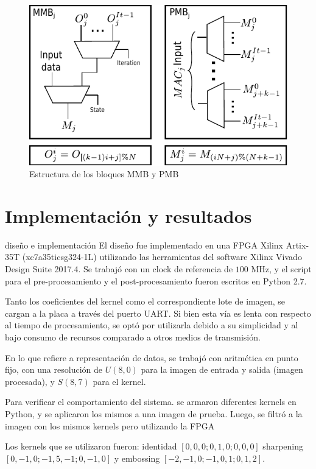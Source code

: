 \documentclass[]{IEEEphot}
\begin{document}
\bigskip
\bigskip
\begin{figure}[H]
\centering
\includegraphics{muxes_cont}
\caption{ Estructura de los bloques MMB y PMB}
\label{mmu_structure}
\end{figure}


\section{Implementación y resultados}  \label{implementations_sec}
 diseño e implementación
El diseño fue implementado en una FPGA Xilinx Artix-35T (xc7a35ticsg324-1L) utilizando las herramientas del software
Xilinx Vivado Design Suite 2017.4. Se trabajó con un clock de referencia de $100$ MHz, y el script para el pre-procesamiento 
y el post-procesamiento fueron escritos en Python 2.7.

Tanto los coeficientes del kernel como el correspondiente lote de imagen, se cargan a la placa a través
del puerto UART. Si bien esta vía es lenta con respecto al tiempo de procesamiento, se optó por utilizarla
debido a su simplicidad y al bajo consumo de recursos comparado a otros medios de transmisión.

En lo que refiere a representación de datos, se trabajó con aritmética en punto fijo, con una
resolución de $U(8,0)$ para la imagen de entrada y salida (imagen procesada), y $S(8,7)$ para el kernel.


Para verificar el comportamiento del sistema. se armaron diferentes kernels
en Python, y se aplicaron los mismos a una imagen de prueba. Luego, 
se filtró a la imagen con los mismos kernels  pero utilizando la FPGA

Los kernels que se utilizaron fueron: identidad $[0, 0, 0; 0, 1, 0; 0, 0,
0]$ sharpening $[0, -1, 0; -1, 5, -1; 0, -1, 0]$ y embossing $[-2, -1, 0; -1,
0, 1; 0, 1, 2]$.\\
\end{document}
